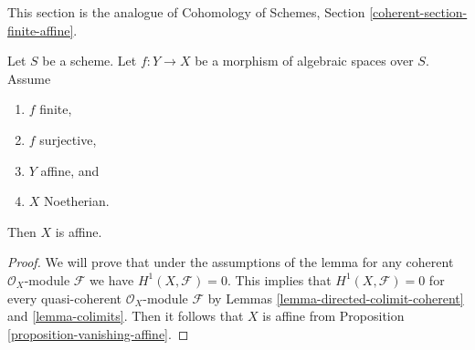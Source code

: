 \noindent
This section is the analogue of
Cohomology of Schemes, Section \ref{coherent-section-finite-affine}.

\begin{lemma}
\label{lemma-image-affine-finite-morphism-affine-Noetherian}
Let $S$ be a scheme. Let $f : Y \to X$ be a morphism of algebraic
spaces over $S$. Assume
\begin{enumerate}
\item $f$ finite,
\item $f$ surjective,
\item $Y$ affine, and
\item $X$ Noetherian.
\end{enumerate}
Then $X$ is affine.
\end{lemma}

\begin{proof}
We will prove that under the assumptions of the lemma for any coherent
$\mathcal{O}_X$-module $\mathcal{F}$ we have $H^1(X, \mathcal{F}) = 0$.
This implies that $H^1(X, \mathcal{F}) = 0$ for every quasi-coherent
$\mathcal{O}_X$-module $\mathcal{F}$ by
Lemmas \ref{lemma-directed-colimit-coherent} and \ref{lemma-colimits}.
Then it follows that $X$ is affine from
Proposition \ref{proposition-vanishing-affine}.


\end{proof}
